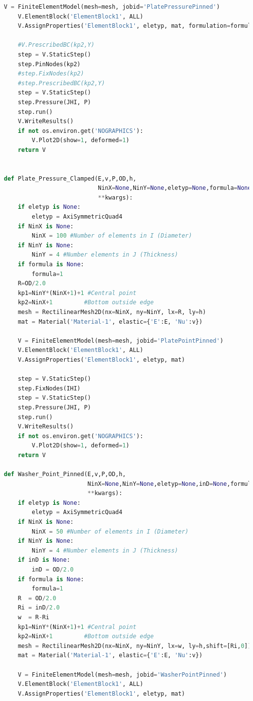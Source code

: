 \documentclass[10pt,letterpaper]{report}
\numberwithin{equation}{chapter}
\begin{document}
\begin{lstlisting}[language=Python]
    V = FiniteElementModel(mesh=mesh, jobid='PlatePressurePinned')
    V.ElementBlock('ElementBlock1', ALL)
    V.AssignProperties('ElementBlock1', eletyp, mat, formulation=formula)
    
    #V.PrescribedBC(kp2,Y)
    step = V.StaticStep()
    step.PinNodes(kp2)
    #step.FixNodes(kp2)
    #step.PrescribedBC(kp2,Y)
    step = V.StaticStep()
    step.Pressure(JHI, P)
    step.run()
    V.WriteResults()
    if not os.environ.get('NOGRAPHICS'):
        V.Plot2D(show=1, deformed=1)
    return V


def Plate_Pressure_Clamped(E,v,P,OD,h,
                           NinX=None,NinY=None,eletyp=None,formula=None,
                           **kwargs):
    if eletyp is None:
        eletyp = AxiSymmetricQuad4
    if NinX is None:
        NinX = 100 #Number of elements in I (Diameter)
    if NinY is None:
        NinY = 4 #Number elements in J (Thickness)
    if formula is None:
        formula=1    
    R=OD/2.0
    kp1=NinY*(NinX+1)+1 #Central point
    kp2=NinX+1         #Bottom outside edge
    mesh = RectilinearMesh2D(nx=NinX, ny=NinY, lx=R, ly=h)
    mat = Material('Material-1', elastic={'E':E, 'Nu':v})
    
    V = FiniteElementModel(mesh=mesh, jobid='PlatePointPinned')
    V.ElementBlock('ElementBlock1', ALL)
    V.AssignProperties('ElementBlock1', eletyp, mat)
    
    step = V.StaticStep()
    step.FixNodes(IHI)
    step = V.StaticStep()
    step.Pressure(JHI, P)
    step.run()
    V.WriteResults()
    if not os.environ.get('NOGRAPHICS'):
        V.Plot2D(show=1, deformed=1)
    return V

def Washer_Point_Pinned(E,v,P,OD,h,
                        NinX=None,NinY=None,eletyp=None,inD=None,formula=None,
                        **kwargs):
    if eletyp is None:
        eletyp = AxiSymmetricQuad4
    if NinX is None:
        NinX = 50 #Number of elements in I (Diameter)
    if NinY is None:
        NinY = 4 #Number elements in J (Thickness)
    if inD is None:
        inD = OD/2.0 
    if formula is None:
        formula=1
    R  = OD/2.0
    Ri = inD/2.0
    w  = R-Ri
    kp1=NinY*(NinX+1)+1 #Central point
    kp2=NinX+1         #Bottom outside edge
    mesh = RectilinearMesh2D(nx=NinX, ny=NinY, lx=w, ly=h,shift=[Ri,0])
    mat = Material('Material-1', elastic={'E':E, 'Nu':v})
    
    V = FiniteElementModel(mesh=mesh, jobid='WasherPointPinned')
    V.ElementBlock('ElementBlock1', ALL)
    V.AssignProperties('ElementBlock1', eletyp, mat)
    

\end{lstlisting}
\end{document}
